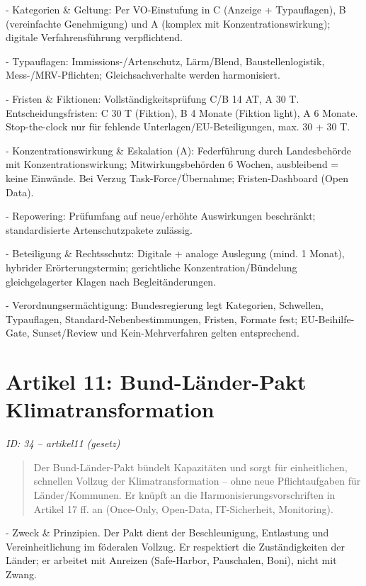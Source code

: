 \documentclass[12pt,a4paper]{scrartcl}
\begin{document}
- Kategorien \& Geltung: Per VO-Einstufung in C (Anzeige + Typauflagen), B (vereinfachte Genehmigung) und A (komplex mit Konzentrationswirkung); digitale Verfahrensführung verpflichtend.

- Typauflagen: Immissions-/Artenschutz, Lärm/Blend, Baustellenlogistik, Mess-/MRV-Pflichten; Gleichsachverhalte werden harmonisiert.

- Fristen \& Fiktionen: Vollständigkeitsprüfung C/B 14 AT, A 30 T. Entscheidungsfristen: C 30 T (Fiktion), B 4 Monate (Fiktion light), A 6 Monate. Stop-the-clock nur für fehlende Unterlagen/EU-Beteiligungen, max. 30 + 30 T.

- Konzentrationswirkung \& Eskalation (A): Federführung durch Landesbehörde mit Konzentrationswirkung; Mitwirkungsbehörden 6 Wochen, ausbleibend = keine Einwände. Bei Verzug Task-Force/Übernahme; Fristen-Dashboard (Open Data).

- Repowering: Prüfumfang auf neue/erhöhte Auswirkungen beschränkt; standardisierte Artenschutzpakete zulässig.

- Beteiligung \& Rechtsschutz: Digitale + analoge Auslegung (mind. 1 Monat), hybrider Erörterungstermin; gerichtliche Konzentration/Bündelung gleichgelagerter Klagen nach Begleitänderungen.

- Verordnungsermächtigung: Bundesregierung legt Kategorien, Schwellen, Typauflagen, Standard-Nebenbestimmungen, Fristen, Formate fest; EU-Beihilfe-Gate, Sunset/Review und Kein-Mehrverfahren gelten entsprechend.


\section[Artikel 11: Bund-Länder-Pakt Klimatransformation]{Artikel 11: Bund-Länder-Pakt Klimatransformation}
\noindent\textit{ID: 34 -- artikel11 (gesetz)}

\begin{quote}
Der Bund-Länder-Pakt bündelt Kapazitäten und sorgt für einheitlichen, schnellen Vollzug der Klimatransformation -- ohne neue Pflichtaufgaben für Länder/Kommunen. Er knüpft an die Harmonisierungsvorschriften in Artikel 17 ff. an (Once-Only, Open-Data, IT-Sicherheit, Monitoring).
\end{quote}

- Zweck \& Prinzipien. Der Pakt dient der Beschleunigung, Entlastung und Vereinheitlichung im föderalen Vollzug. Er respektiert die Zuständigkeiten der Länder; er arbeitet mit Anreizen (Safe-Harbor, Pauschalen, Boni), nicht mit Zwang.
\end{document}
